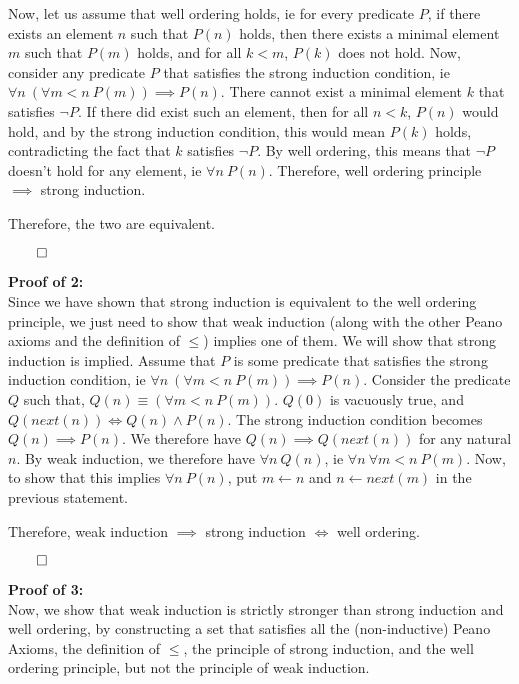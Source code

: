 \documentclass[12pt]{report}
\begin{document}
Now, let us assume that well ordering holds, ie for every predicate $P$, if there exists an element $n$ such that $P(n)$ holds, then there exists a minimal element $m$ such that $P(m)$ holds, and for all $k < m$, $P(k)$ does not hold. Now, consider any predicate $P$ that satisfies the strong induction condition, ie $\forall n\ (\forall m < n\ P(m)) \implies P(n)$. There cannot exist a minimal element $k$ that satisfies $\neg P$. If there did exist such an element, then for all $n < k$, $P(n)$ would hold, and by the strong induction condition, this would mean $P(k)$ holds, contradicting the fact that $k$ satisfies $\neg P$. By well ordering, this means that $\neg P$ doesn't hold for any element, ie $\forall n\ P(n)$. Therefore, well ordering principle $\implies$ strong induction. 

Therefore, the two are equivalent.

$\qed$

\textbf{Proof of 2:}\\
Since we have shown that strong induction is equivalent to the well ordering principle, we just need to show that weak induction (along with the other Peano axioms and the definition of $\leq$) implies one of them. We will show that strong induction is implied. Assume that $P$ is some predicate that satisfies the strong induction condition, ie $\forall n\ (\forall m < n\ P(m)) \implies P(n)$. Consider the predicate $Q$ such that, $Q(n) \equiv (\forall m < n\ P(m))$. $Q(0)$ is vacuously true, and $Q(next(n)) \iff Q(n) \land P(n)$. The strong induction condition becomes $Q(n) \implies P(n)$. We therefore have $Q(n) \implies Q(next(n))$ for any natural $n$. By weak induction, we therefore have $\forall n\ Q(n)$, ie $\forall n\ \forall m < n\ P(m)$. Now, to show that this implies $\forall n\ P(n)$, put $m \leftarrow n$ and $n \leftarrow next(m)$ in the previous statement. 

Therefore, weak induction $\implies$ strong induction $\iff$ well ordering.

$\qed$

\textbf{Proof of 3:}\\
Now, we show that weak induction is strictly stronger than strong induction and well ordering, by constructing a set that satisfies all the (non-inductive) Peano Axioms, the definition of $\leq$, the principle of strong induction, and the well ordering principle, but not the principle of weak induction. 
\end{document}
